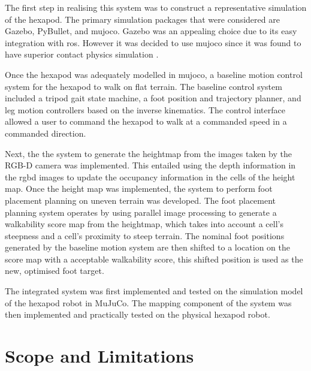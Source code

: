     The first step in realising this system was to construct a representative simulation of the hexapod. The primary simulation packages that were considered are Gazebo, PyBullet, and \ac{mujoco}.
    Gazebo was an appealing choice due to its easy integration with \acf{ros}. However it was decided to use \ac{mujoco} since it was found to have superior contact physics simulation \citep{Erez-2015}.

    Once the hexapod was adequately modelled in \ac{mujoco}, a baseline motion control system for the hexapod to walk on flat terrain. The baseline control system included a tripod gait state machine,
    a foot position and trajectory planner, and leg motion controllers based on the inverse kinematics. The control interface allowed a user to command the hexapod to walk at a commanded speed in a commanded direction.

    Next, the the system to generate the heightmap from the images taken by the RGB-D camera was implemented. This entailed using the depth information in the \ac{rgbd} images
    to update the occupancy information in the cells of the height map.
    Once the height map was implemented, the system to perform foot placement planning on uneven terrain was developed. 
    The foot placement planning system operates by using parallel image processing to generate a
    walkability score map from the heightmap, which takes into account a cell's steepness and a cell's proximity to steep terrain.
    The nominal foot positions generated by the baseline motion system are then shifted to a location on 
    the score map with a acceptable walkability score, this shifted position is used as the new, optimised foot target.

    The integrated system was first implemented and tested on the simulation model of the hexapod robot in MuJuCo.
    The mapping component of the system was then implemented and practically tested on the physical hexapod robot.

\section{Scope and Limitations}


    
